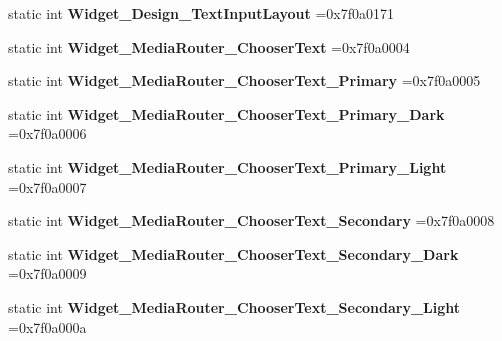 \begin{DoxyCompactItemize}
static int {\bfseries Widget\+\_\+\+Design\+\_\+\+Text\+Input\+Layout} =0x7f0a0171
\item 
\mbox{\label{classandroid_1_1support_1_1v7_1_1recyclerview_1_1R_1_1style_a9fb2a2bed30c3de0ccdaf7f810c8dea4}} 
static int {\bfseries Widget\+\_\+\+Media\+Router\+\_\+\+Chooser\+Text} =0x7f0a0004
\item 
\mbox{\label{classandroid_1_1support_1_1v7_1_1recyclerview_1_1R_1_1style_a192f35f69f0616981970b42a82450b76}} 
static int {\bfseries Widget\+\_\+\+Media\+Router\+\_\+\+Chooser\+Text\+\_\+\+Primary} =0x7f0a0005
\item 
\mbox{\label{classandroid_1_1support_1_1v7_1_1recyclerview_1_1R_1_1style_aa7bad28f792ff385a98c20ef1eb0f4b8}} 
static int {\bfseries Widget\+\_\+\+Media\+Router\+\_\+\+Chooser\+Text\+\_\+\+Primary\+\_\+\+Dark} =0x7f0a0006
\item 
\mbox{\label{classandroid_1_1support_1_1v7_1_1recyclerview_1_1R_1_1style_a54fa8de547554215040d2104a805d551}} 
static int {\bfseries Widget\+\_\+\+Media\+Router\+\_\+\+Chooser\+Text\+\_\+\+Primary\+\_\+\+Light} =0x7f0a0007
\item 
\mbox{\label{classandroid_1_1support_1_1v7_1_1recyclerview_1_1R_1_1style_ad49464104496d4ed6a87fca9052a3165}} 
static int {\bfseries Widget\+\_\+\+Media\+Router\+\_\+\+Chooser\+Text\+\_\+\+Secondary} =0x7f0a0008
\item 
\mbox{\label{classandroid_1_1support_1_1v7_1_1recyclerview_1_1R_1_1style_a46ce4763fce9c5d4ec4b3b917a1ebb27}} 
static int {\bfseries Widget\+\_\+\+Media\+Router\+\_\+\+Chooser\+Text\+\_\+\+Secondary\+\_\+\+Dark} =0x7f0a0009
\item 
\mbox{\label{classandroid_1_1support_1_1v7_1_1recyclerview_1_1R_1_1style_ae36160a41a40c4b1ad623e347a3cba3e}} 
static int {\bfseries Widget\+\_\+\+Media\+Router\+\_\+\+Chooser\+Text\+\_\+\+Secondary\+\_\+\+Light} =0x7f0a000a

\end{DoxyCompactItemize}
